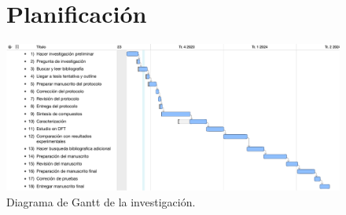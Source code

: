 \documentclass[spanish,mexico,12pt]{scrartcl}
\begin{document}
\begin{figure}
    \section{Planificación}
    \includegraphics[width=0.9\linewidth]{gantt.pdf}
    \caption{Diagrama de Gantt de la investigación.}
    \label{fig:gantt}
\end{figure}
\printreactants{}
\printglossaries{}
\printbibliography{}

\listoftodos[Pendientes]
\end{document}
